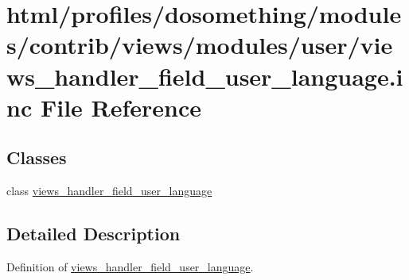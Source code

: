 \hypertarget{views__handler__field__user__language_8inc}{
\section{html/profiles/dosomething/modules/contrib/views/modules/user/views\_\-handler\_\-field\_\-user\_\-language.inc File Reference}
\label{views__handler__field__user__language_8inc}
}
\subsection*{Classes}
\begin{DoxyCompactItemize}
\item 
class \hyperlink{classviews__handler__field__user__language}{views\_\-handler\_\-field\_\-user\_\-language}
\end{DoxyCompactItemize}


\subsection{Detailed Description}
Definition of \hyperlink{classviews__handler__field__user__language}{views\_\-handler\_\-field\_\-user\_\-language}. 